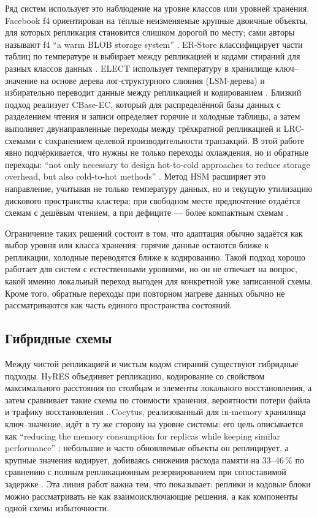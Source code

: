 Ряд систем использует это наблюдение на уровне классов или уровней хранения.
Facebook f4 ориентирован на тёплые неизменяемые крупные двоичные объекты, для
которых репликация становится слишком дорогой по месту; сами авторы называют
f4 \enquote{a warm BLOB storage system} \cite{muralidhar2014f4}.
ER-Store классифицирует части таблиц по температуре и выбирает между
репликацией и кодами стираний для разных классов данных \cite{li2021erstore}.
ELECT использует температуру в хранилище ключ--значение на основе дерева
лог-структурного слияния (LSM-дерева) и избирательно переводит данные между
репликацией и кодированием \cite{ren2024elect}. Близкий подход реализует
CBase-EC, который для распределённой базы данных с разделением чтения и записи
определяет горячие и холодные таблицы, а затем выполняет двунаправленные
переходы между трёхкратной репликацией и LRC-схемами с сохранением целевой
производительности транзакций. В этой работе явно подчёркивается, что нужны
не только переходы охлаждения, но и обратные переходы: \enquote{not only
necessary to design hot-to-cold approaches to reduce storage overhead, but also
cold-to-hot methods} \cite{yao2021cbaseec}. Метод HSM расширяет это
направление, учитывая не только температуру данных, но и текущую утилизацию
дискового пространства кластера: при свободном месте предпочтение отдаётся
схемам с дешёвым чтением, а при дефиците --- более компактным схемам
\cite{song2024hsm}.

Ограничение таких решений состоит в том, что адаптация обычно задаётся как
выбор уровня или класса хранения: горячие данные остаются ближе к репликации,
холодные переводятся ближе к кодированию. Такой подход хорошо работает для
систем с естественными уровнями, но он не отвечает на вопрос, какой именно
локальный переход выгоден для конкретной уже записанной схемы. Кроме того,
обратные переходы при повторном нагреве данных обычно не рассматриваются как
часть единого пространства состояний.

\subsection*{Гибридные схемы}

Между чистой репликацией и чистым кодом стираний существуют гибридные подходы.
HyRES объединяет репликацию, кодирование со свойством максимального
расстояния по столбцам и элементы локального восстановления, а затем
сравнивает такие схемы по стоимости хранения, вероятности потери файла и
трафику восстановления \cite{lucani2025hyres}. Cocytus, реализованный для
in-memory хранилища ключ--значение, идёт в ту же сторону на уровне системы:
его цель описывается как \enquote{reducing the memory consumption for replicas
while keeping similar performance} \cite{zhang2016cocytus}; небольшие и часто
обновляемые объекты он реплицирует, а крупные значения
кодирует, добиваясь снижения расхода памяти на 33--46\,\% по сравнению с
полным репликационным резервированием при сопоставимой задержке
\cite{zhang2016cocytus}. Эта линия работ важна тем, что показывает: реплики
и кодовые блоки можно рассматривать не как взаимоисключающие решения, а как
компоненты одной схемы избыточности.


